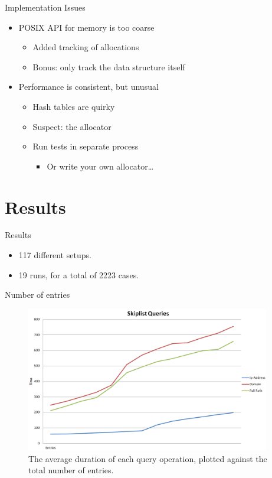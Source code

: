 \documentclass[10pt]{beamer}
\begin{document}
\begin{frame}{Implementation Issues}
    \begin{itemize}
        \item POSIX API for memory is too coarse
        \begin{itemize}
            \item Added tracking of allocations
            \item Bonus: only track the data structure itself
        \end{itemize}
        \item Performance is consistent, but unusual
        \begin{itemize}
            \item Hash tables are quirky
            \item Suspect: the allocator
            \item Run tests in separate process
            \begin{itemize}
                \item Or write your own allocator\ldots
            \end{itemize}
        \end{itemize}
    \end{itemize}
\end{frame}

\section{Results}

\begin{frame}{Results}
    \begin{itemize}
        \item 117 different setups.
        \item 19 runs, for a total of 2223 cases.
    \end{itemize}
\end{frame}

\begin{frame}{Number of entries}
    \begin{figure}
      \centering
        \includegraphics[width=0.95\textwidth]{SkiplistQuery}
      \caption{The average duration of each query operation, plotted against the total number of entries.}
    \end{figure}
\end{frame}
\end{document}
